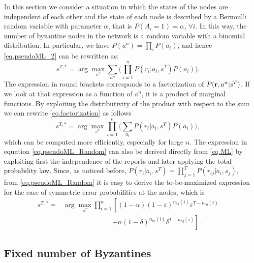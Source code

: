 \documentclass[10pt,peerreview,draftcls,onecolumn]{IEEEtran}
\begin{document}
In this section we consider a situation in which the states of the nodes are independent of each other and the state of each node is described by a Bernoulli random variable with parameter $\alpha$, that is $P(A_i = 1) = \alpha$, $\forall i$. In this way, the number of byzantine nodes in the network is a random variable with a binomial distribution.
In particular, we have $P(a^n) = \prod_i P(a_i)$, and hence \eqref{eq.pseudoML_2} can be rewritten as:
\begin{equation}
s^{T,*} = \arg\max_{s^T} \sum_{a^n} \bigg(\prod_{i=1}^n P(r_i | a_i, s^T )P(a_i) \bigg).
\label{eq.factorization}
\end{equation}
The expression in round brackets corresponds to a factorization of $P({\bf r}, a^n | s^T )$.
If we look at that expression as a function of $a^n$, it is a product of marginal functions.
By exploiting the distributivity of the product with respect to the sum
we can rewrite \eqref{eq.factorization} as follows
\begin{equation}
s^{T,*} =  \arg\max_{s^T} \prod_{i=1}^{n} \bigg(\sum_{a_i} P( r_i| a_i, s^T) P(a_i) \bigg),
\label{eq.pseudoML_Random}
\end{equation}
which can be computed more efficiently, especially for large $n$.
The expression in equation \eqref{eq.pseudoML_Random} can also be derived directly from \eqref{eq.ML} by exploiting first the independence of the reports and later applying the total probability law.
Since, as noticed before, $P( r_i| a_i, s^T) = \prod_{j=1}^T P( r_{ij}| a_i, s_j)$, from \eqref{eq.pseudoML_Random}
it is easy to derive the to-be-maximized expression for the case of symmetric error probabilities at the nodes, which is
\begin{align}
s^{T,*} = & \arg\max_{s^T} \prod_{i=1}^{n} \left[(1-\alpha)(1-\varepsilon)^{n_{eq}(i)} \varepsilon^{T-n_{eq}(i)}\right.\nonumber\\
 & \hspace{3cm} \left.+ \alpha(1-\delta)^{n_{eq}(i)} \delta^{T-n_{eq}(i)}\right].
 \label{eq.pseudoML_Random_2}
\end{align}




\subsection{Fixed number of Byzantines}
\label{sec.OF_DETstates}
\end{document}
